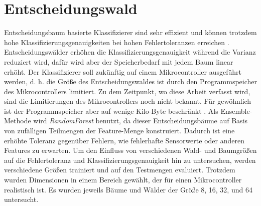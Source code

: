 \section{Entscheidungswald}
\label{sec:model_dt}
Entscheidungsbaum basierte Klassifizierer sind sehr effizient und können trotzdem hohe Klassifizierungsgenauigkeiten bei hohen Fehlertoleranzen erreichen \cite{dymelThesis}.
Entscheidungswälder erhöhen die Klassifizierungsgenauigkeit während die Varianz reduziert wird, dafür wird aber der Speicherbedarf mit jedem Baum linear erhöht.
Der Klassifizierer soll zukünftig auf einem Mikrocontroller ausgeführt werden, d. h. die Größe des Entscheidungswaldes ist durch den Programmspeicher des Mikrocontrollers limitiert.
Zu dem Zeitpunkt, wo diese Arbeit verfasst wird, sind die Limitierungen des Mikrocontrollers noch nicht bekannt.
Für gewöhnlich ist der Programmspeicher aber auf wenige Kilo-Byte beschränkt \cite{dymelThesis}.
\newline
\newline
Als Ensemble-Methode wird \textit{RandomForest} benutzt, da dieser Entscheidungsbäume auf Basis von zufälligen Teilmengen der Feature-Menge konstruiert.
Dadurch ist eine erhöhte Toleranz gegenüber Fehlern, wie fehlerhafte Sensorwerte oder anderen Features zu erwarten.
\newline
\newline
Um den Einfluss von verschiedenen Wald- und Baumgrößen auf die Fehlertoleranz und Klassifizierungsgenauigkeit hin zu untersuchen, werden verschiedene Größen
trainiert und auf den Testmengen evaluiert. Trotzdem wurden Dimensionen in einem Bereich gewählt, der für einen Mikrocontroller realistisch ist.
Es wurden jeweils Bäume und Wälder der Größe 8, 16, 32, und 64 untersucht.